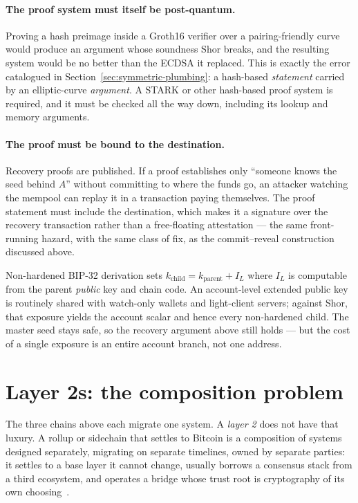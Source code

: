 \paragraph{The proof system must itself be post-quantum.}
Proving a hash preimage inside a Groth16 verifier over a pairing-friendly curve
would produce an argument whose soundness Shor breaks, and the resulting system
would be no better than the ECDSA it replaced. This is exactly the error
catalogued in Section~\ref{sec:symmetric-plumbing}: a hash-based
\emph{statement} carried by an elliptic-curve \emph{argument}. A STARK or other
hash-based proof system is required, and it must be checked all the way down,
including its lookup and memory arguments.

\paragraph{The proof must be bound to the destination.}
Recovery proofs are published. If a proof establishes only ``someone knows the
seed behind $A$'' without committing to where the funds go, an attacker watching
the mempool can replay it in a transaction paying themselves. The proof statement
must include the destination, which makes it a signature over the recovery
transaction rather than a free-floating attestation --- the same front-running
hazard, with the same class of fix, as the commit--reveal construction discussed
above.

\begin{remark}
Non-hardened BIP-32 derivation sets $k_{\text{child}} = k_{\text{parent}} + I_L$
where $I_L$ is computable from the parent \emph{public} key and chain code. An
account-level extended public key is routinely shared with watch-only wallets and
light-client servers; against Shor, that exposure yields the account scalar and
hence every non-hardened child. The master seed stays safe, so the recovery
argument above still holds --- but the cost of a single exposure is an entire
account branch, not one address.
\end{remark}

\section{Layer 2s: the composition problem}
\label{sec:l2-composition}

The three chains above each migrate one system. A \emph{layer 2} does not have
that luxury. A rollup or sidechain that settles to Bitcoin is a composition of
systems designed separately, migrating on separate timelines, owned by separate
parties: it settles to a base layer it cannot change, usually borrows a
consensus stack from a third ecosystem, and operates a bridge whose trust root
is cryptography of its own choosing~\cite{btcl2pqc}.

